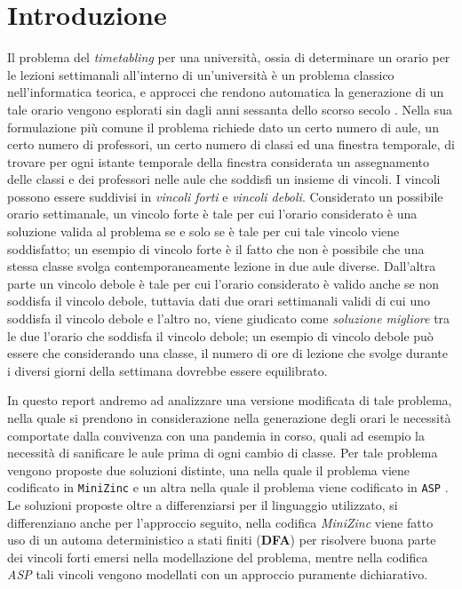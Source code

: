 \documentclass[12pt, italian, openany]{book}
\begin{document}
\chapter{Introduzione}
Il problema del \textit{timetabling} per una università, ossia di determinare un orario per le lezioni settimanali all'interno di un'università è un problema classico nell'informatica teorica, e approcci che rendono automatica la generazione di un tale orario vengono esplorati sin dagli anni sessanta dello scorso secolo \cite{DBLP:journals/air/Schaerf99}. Nella sua formulazione più comune il problema richiede dato un certo numero di aule, un certo numero di professori, un certo numero di classi ed una finestra temporale, di trovare per ogni istante temporale della finestra considerata un assegnamento delle classi e dei professori nelle aule che soddisfi un insieme di vincoli. I vincoli possono essere suddivisi in \textit{vincoli forti} e \textit{vincoli deboli}.
Considerato un possibile orario settimanale, un vincolo forte è tale per cui l'orario considerato è una soluzione valida al problema se e solo se è tale per cui tale vincolo viene soddisfatto; un esempio di vincolo forte è il fatto che non è possibile che una stessa classe svolga contemporaneamente lezione in due aule diverse.
Dall'altra parte un vincolo debole è tale per cui l'orario considerato è valido anche se non soddisfa il vincolo debole, tuttavia dati due orari settimanali validi di cui uno soddisfa il vincolo debole e l'altro no, viene giudicato come \textit{soluzione migliore} tra le due l'orario che soddisfa il vincolo debole; un esempio di vincolo debole può essere che considerando una classe, il numero di ore di lezione che svolge durante i diversi giorni della settimana dovrebbe essere equilibrato.

In questo report andremo ad analizzare una versione modificata di tale problema, nella quale si prendono in considerazione nella generazione degli orari le necessità comportate dalla convivenza con una pandemia in corso, quali ad esempio la necessità di sanificare le aule prima di ogni cambio di classe. Per tale problema vengono proposte due soluzioni distinte, una nella quale il problema viene codificato in \texttt{MiniZinc} \cite{DBLP:conf/cp/NethercoteSBBDT07} e un altra nella quale il problema viene codificato in \texttt{ASP}  \cite{DBLP:journals/corr/GebserKKS14}. Le soluzioni proposte oltre a differenziarsi per il linguaggio utilizzato, si differenziano anche per l'approccio seguito, nella codifica \textit{MiniZinc} viene fatto uso di un automa deterministico a stati finiti (\textbf{DFA}) per risolvere buona parte dei vincoli forti emersi nella modellazione del problema, mentre nella codifica \textit{ASP} tali vincoli vengono modellati con un approccio puramente dichiarativo.
\end{document}
